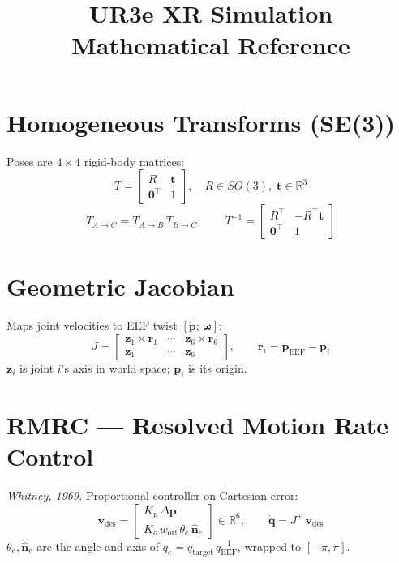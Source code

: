 \documentclass[11pt,a4paper]{article}
\title{UR3e XR Simulation\\[4pt]\large Mathematical Reference}
\author{}
\date{}
\begin{document}
\maketitle
\tableofcontents
\newpage

\section{Homogeneous Transforms (SE(3))}

Poses are $4\times4$ rigid-body matrices:
\[
T = \begin{bmatrix} R & \mathbf{t} \\ \mathbf{0}^\top & 1 \end{bmatrix},
\quad R \in SO(3),\; \mathbf{t} \in \mathbb{R}^3
\]
\[
T_{A\to C} = T_{A\to B}\,T_{B\to C}, \qquad
T^{-1} = \begin{bmatrix} R^\top & -R^\top\mathbf{t} \\ \mathbf{0}^\top & 1 \end{bmatrix}
\]

\section{Geometric Jacobian}

Maps joint velocities to EEF twist $[\dot{\mathbf{p}};\,\boldsymbol{\omega}]$:
\[
J = \begin{bmatrix}
\mathbf{z}_1 \times \mathbf{r}_1 & \cdots & \mathbf{z}_6 \times \mathbf{r}_6 \\[3pt]
\mathbf{z}_1 & \cdots & \mathbf{z}_6
\end{bmatrix}, \qquad
\mathbf{r}_i = \mathbf{p}_{\text{EEF}} - \mathbf{p}_i
\]
$\mathbf{z}_i$ is joint $i$'s axis in world space; $\mathbf{p}_i$ is its origin.

\section{RMRC — Resolved Motion Rate Control}

\textit{Whitney, 1969.} Proportional controller on Cartesian error:
\[
\mathbf{v}_{\text{des}} =
\begin{bmatrix} K_p\,\Delta\mathbf{p} \\ K_o\,w_\text{ori}\,\theta_e\,\hat{\mathbf{n}}_e \end{bmatrix}
\in \mathbb{R}^6, \qquad \dot{\mathbf{q}} = J^+\,\mathbf{v}_{\text{des}}
\]
$\theta_e, \hat{\mathbf{n}}_e$ are the angle and axis of $q_e = q_{\text{target}}\,q_{\text{EEF}}^{-1}$, wrapped to $[-\pi,\pi]$.
\end{document}
